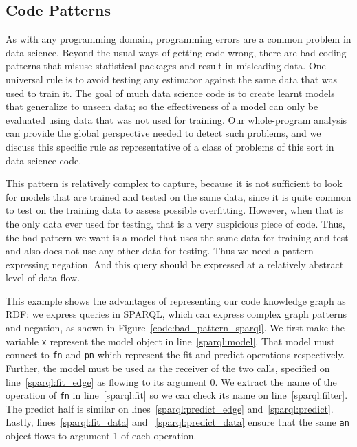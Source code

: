 \subsection{Code Patterns}

 As with any programming domain, programming errors are a common problem in data science.  Beyond the usual ways of getting code wrong, there are bad coding patterns that misuse statistical packages and result in misleading data.  One universal rule is to avoid testing any estimator against the same data that was used to train it.  The goal of much data science code is to create learnt models that generalize to unseen data; so the effectiveness of a model can only be evaluated using data that was not used for training.  Our whole-program analysis can provide the global perspective needed to detect such problems, and we discuss this specific rule as representative of a class of problems of this sort in data science code. 

 This pattern is relatively complex to capture, because it is not sufficient to look for models that are trained and tested on the same data, since it is quite common to test on the training data to assess possible overfitting.  However, when that is the only data ever used for testing, that is a very suspicious piece of code.  Thus, the bad pattern we want is a model that uses the same data for training and test and also does not use any other data for testing.  Thus we need a pattern expressing negation.  And this query should be expressed at a relatively abstract level of data flow.

This example shows the advantages of representing our code knowledge graph as RDF: we express queries in SPARQL, which can express complex graph patterns and negation, as shown in Figure~\ref{code:bad_pattern_sparql}.  We first make the variable {\tt x} represent the model object in line~\ref{sparql:model}.  That model must connect to {\tt fn} and {\tt pn} which represent the fit and predict operations respectively.  Further, the model must be used as the receiver of the two calls, specified on line~\ref{sparql:fit_edge} as flowing to its argument 0.  We extract the name of the operation of {\tt fn} in line~\ref{sparql:fit} so we can check its name on line~\ref{sparql:filter}.  The predict half is similar on lines~\ref{sparql:predict_edge} and~\ref{sparql:predict}.  Lastly, lines~\ref{sparql:fit_data} and ~\ref{sparql:predict_data} ensure that the same {\tt an} object flows to argument 1 of each operation.

